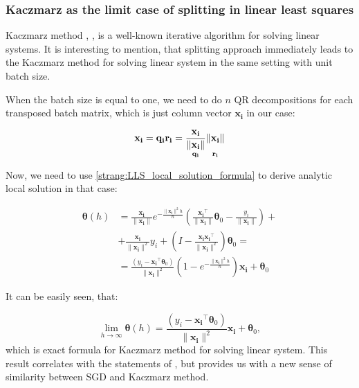 \documentclass{article}
\newcommand{\vect}[1]{\boldsymbol{\mathbf{#1}}}
\begin{document}
\subsubsection{Kaczmarz as the limit case of splitting in linear least squares}
Kaczmarz method \citet{kaczmarz1937method}, \citet{strohmer2009randomized}, \citet{gower2015randomized} is a well-known iterative algorithm for solving linear systems.
It is interesting to mention, that splitting approach immediately leads to the Kaczmarz method for solving linear system in the same setting with unit batch size.

When the batch size is equal to one, we need to do $n$ QR decompositions for each transposed batch matrix, which is just column vector $\vect{x_i}$ in our case:

\begin{equation}
\vect{x_i} = \vect{q_i} \vect{r_i} = \underset{\vect{q_i} }{\frac{\vect{x_i}}{\|\vect{x_i}\|}} \underset{\vect{r_i}}{\vphantom{\frac{\vect{x_i}}{\|\vect{x_i}\|}} \|\vect{x_i}\|}
\end{equation}

Now, we need to use \eqref{strang:LLS_local_solution_formula} to derive analytic local solution in that case:

\begin{equation*}
\begin{split}
\vect{\theta}(h) &= \frac{\vect{x_i}}{\|\vect{x_i}\|} e^{-\frac{\|\vect{x_i}\|^2 h}{n}} \left( \frac{\vect{x_i}^\top}{\|\vect{x_i}\|} \vect{\theta}_0 - \frac{y_i}{\|\vect{x_i}\|}\right) + \\ &+ \frac{\vect{x_i}}{\|\vect{x_i}\|^2}y_i + \left(I - \frac{\vect{x_i}\vect{x_i}^\top}{\|\vect{x_i}\|^2}\right)\vect{\theta}_0 = \\
&= \frac{\left(y_i -\vect{x_i}^\top\vect{\theta}_0 \right)}{\|\vect{x_i}\|^2}  \left(1 - e^{-\frac{\|\vect{x_i}\|^2 h}{n}}\right)\vect{x_i} + \vect{\theta}_0
\end{split}
\end{equation*}

It can be easily seen, that:

\begin{equation}
\label{strang:splitting_limit_kaczmarz}
\lim_{h \to \infty} \vect{\theta}(h) = \frac{\left(y_i - \vect{x_i}^\top\vect{\theta}_0 \right)}{\|\vect{x_i}\|^2} \vect{x_i} + \vect{\theta}_0,
\end{equation}
which is exact formula for Kaczmarz method for solving linear system. This result correlates with the statements of \citet{needell2014stochastic}, but provides us with a new sense of similarity between SGD and Kaczmarz method.
\end{document}
